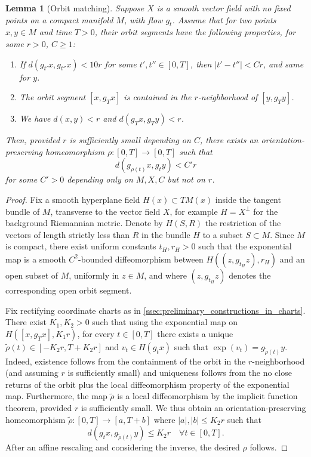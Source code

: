 \documentclass[11pt]{amsart}
\theoremstyle{mytheoremstyle}
\theoremstyle{mydefinitionstyle}
\theoremstyle{mytheoremstyle}
\numberwithin{equation}{section}
\newtheorem{lemma}[lemma]{Lemma}
\theoremstyle{mydefinitionstyle}
\begin{document}
\begin{lemma}[Orbit matching]
	\label{lem:orbit_matching}
	Suppose $X$ is a smooth vector field with no fixed points on a compact manifold $M$, with flow $g_t$.
	Assume that for two points $x,y\in M$ and time $T>0$, their orbit segments have the following properties, for some $r>0$, $C\geq 1$:
	\begin{enumerate}
		\item If $d(g_{t'}x,g_{t''}x)<10r$ for some $t',t''\in [0,T]$, then $|t'-t''|<Cr$, and same for $y$.
		\item The orbit segment $[x,g_Tx]$ is contained in the $r$-neighborhood of $[y,g_Ty]$.
		\item We have $d(x,y)<r$ and $d(g_Tx,g_Ty)<r$.
	\end{enumerate}

	Then, provided $r$ is sufficiently small depending on $C$, there exists an orientation-preserving homeomorphism $\rho\colon [0,T]\to [0,T]$ such that
	\[
		d(g_{\rho(t)}x, g_t y)<C' r
	\]
	for some $C'>0$ depending only on $M,X,C$ but not on $r$.
\end{lemma}
\begin{proof}
	Fix a smooth hyperplane field $H(x)\subset TM(x)$ inside the tangent bundle of $M$, transverse to the vector field $X$, for example $H=X^\perp$ for the background Riemannian metric.
	Denote by $H(S,R)$ the restriction of the vectors of length strictly less than $R$ in the bundle $H$ to a subset $S\subset M$.
	Since $M$ is compact, there exist uniform constants $t_H,r_H>0$ such that the exponential map is a smooth $C^2$-bounded diffeomorphism between $H((z,g_{t_H}z),r_H)$ and an open subset of $M$, uniformly in $z\in M$, and where $(z,g_{t_H} z)$ denotes the corresponding open orbit segment.

	Fix rectifying coordinate charts as in \autoref{ssec:preliminary_constructions_in_charts}.
	There exist $K_1,K_2>0$ such that using the exponential map on $H([x,g_T x],K_1 r)$, for every $t\in [0,T]$ there exists a unique $\tilde{\rho}(t)\in [-K_2r, T+K_2r]$ and $v_t\in H(g_t x)$ such that $\exp(v_t)=g_{\tilde{\rho}(t)}y$.
	Indeed, existence follows from the containment of the orbit in the $r$-neighborhood (and assuming $r$ is sufficiently small) and uniqueness follows from the no close returns of the orbit plus the local diffeomorphism property of the exponential map.
	Furthermore, the map $\tilde{\rho}$ is a local diffeomorphism by the implicit function theorem, provided $r$ is sufficiently small.
	We thus obtain an orientation-preserving homeomorphism $\tilde{\rho}\colon [0,T] \to [a, T+b]$ where $|a|,|b|\leq K_2 r$ such that
	\[
		d(g_{t}x, g_{\tilde{\rho}(t)}y)\leq K_2 r \quad \forall t\in [0,T].
	\]
	After an affine rescaling and considering the inverse, the desired $\rho$ follows.
\end{proof}
\end{document}
